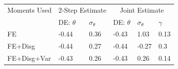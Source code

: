 \documentclass[12pt]{article}
\begin{document}
\begin{table}[p]
\begin{tabular}{llllll}
			\hline 
		Moments Used & \multicolumn{2}{c}{2-Step Estimate}                              & \multicolumn{3}{c}{Joint Estimate}                           \\
		& DE: $\theta$                        & $\sigma_\theta$            & DE: $\theta$              & $\sigma_\theta$       & $\gamma$ \\
			\hline 
		FE        & -0.44                               & 0.36                       & -0.43                     & 1.03                  & 0.13     \\
		FE+Disg      & -0.44                               & 0.27                       & -0.44                     & -0.27                 & 0.3      \\
		FE+Disg+Var  & -0.43                               & 0.26                       & -0.43                     & 0.26                  & 0.14    \\
		\hline 
	\end{tabular}
\end{table}
\end{document}
